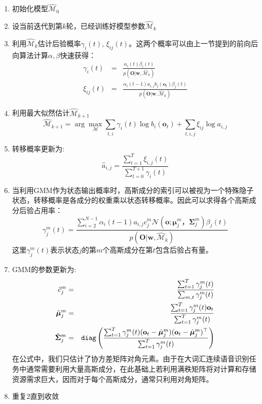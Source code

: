 \begin{enumerate}
    \item 初始化模型$\hat{\mathcal{M}}_0$
    \item 设当前迭代到第$k$轮，已经训练好模型参数$\hat{\mathcal{M}}_k$
    \item 利用$\hat{\mathcal{M}}_k$估计后验概率$\gamma_i(t)$, $\xi_{ij}(t)$。这两个概率可以由上一节提到的前向后向算法计算$\alpha,\beta$快速获得：
    \begin{eqnarray}
    \gamma_i(t)&=&\frac{\alpha_i(t)\beta_i(t)}{p(\mathbf{O}|\mathbf{w}, \hat{\mathcal{M}}_k)} \\
    \xi_{ij}(t)&=&\frac{\alpha_i(t-1)a_{i,j}b_j(\mathbf{o}_t)\beta_j(t)}{p(\mathbf{O}|\mathbf{w}, \hat{\mathcal{M}}_k)}
    \end{eqnarray}
    \item 利用最大似然估计$\hat{\mathcal{M}}_{k+1}$
    \begin{equation}
        \hat{\mathcal{M}}_{k+1} = \arg \max_{\mathcal{M}} \sum_{t,i} \gamma_i(t)\log b_i(\mathbf{o}_t) + \sum_{t,i,j}\xi_{ij}\log a_{i,j}
    \end{equation}
    \item 转移概率更新为:
    \begin{equation}
        \hat{a}_{i,j}=\frac{\sum_{t=1}^T \xi_{i,j}(t)}{\sum_{t=0}^{T+1} \gamma_i(t)}
    \end{equation}
    \item 当利用GMM作为状态输出概率时，高斯成分的索引可以被视为一个特殊隐子状态，转移概率是各成分的权重乘以状态转移概率。因此可以求得各个高斯成分后验占用率：
    \begin{equation}
        \gamma^m_j(t)=\frac{\sum_{i=2}^{N-1}\alpha_i(t-1)a_{i,j}c^m_{j}\mathcal{N}(\mathbf{o}; \bm{\mu}^m_j， \bm{\Sigma}^m_j)\beta_j(t)}{p(\mathbf{O}|\mathbf{w}, \hat{\mathcal{M}}_k)}   
    \end{equation}
    这里$\gamma^m_j(t)$表示状态$j$的第$m$个高斯成分在第$t$包含后验占有量。
    \item GMM的参数更新为:
    \begin{eqnarray}
        \hat{c}^m_j &=& \frac{\sum_{t=1}^T \gamma^m_j(t)}{\sum_{m,t} \gamma^m_j(t)} \\
        \hat{\bm{\mu}}^m_j &=& \frac{\sum_{t=1}^T \gamma^m_j(t) \mathbf{o}_t}{\sum_{t=1}^T \gamma^m_j(t)} \\
        \hat{\bm{\Sigma}}^m_j &=& {\tt diag} \left( \frac{\sum_{t=1}^T \gamma^m_j(t) (\mathbf{o}_t-\hat{\bm{\mu}}^m_j)(\mathbf{o}_t-\hat{\bm{\mu}}^m_j)^{\top}}{\sum_{t=1}^T \gamma^m_j(t)} \right)
    \end{eqnarray}
    在公式中，我们只估计了协方差矩阵对角元素。由于在大词汇连续语音识别任务中通常需要利用大量高斯成分，在此基础上若利用满秩矩阵将对计算和存储资源需求巨大，因而对于每个高斯成分，通常只利用对角矩阵。
    \item 重复2直到收敛
\end{enumerate}

